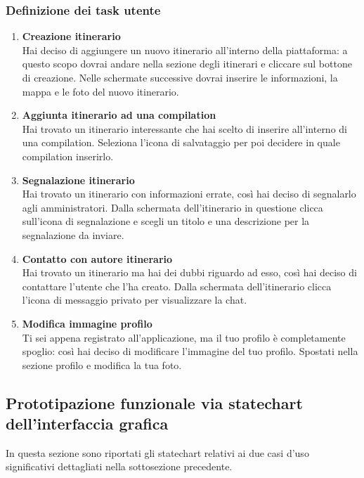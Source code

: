 \documentclass{natourDoc}
\begin{document}
\subsubsection{Definizione dei task utente}
\begin{enumerate}
	\item \textbf{Creazione itinerario} \\
	Hai deciso di aggiungere un nuovo itinerario all’interno della piattaforma: a questo scopo 
	dovrai andare nella sezione degli itinerari e cliccare sul bottone di creazione. Nelle schermate successive dovrai inserire le informazioni, la mappa e le foto del nuovo itinerario.
	\item \textbf{Aggiunta itinerario ad una compilation} \\
	Hai trovato un itinerario interessante che hai scelto di inserire all’interno di una compilation. Seleziona l’icona di salvataggio per poi decidere in quale compilation inserirlo.
	\item \textbf{Segnalazione itinerario} \\
	Hai trovato un itinerario con informazioni errate, così hai deciso di segnalarlo agli amministratori. Dalla schermata dell’itinerario in questione clicca sull'icona di segnalazione e 
	scegli un titolo e una descrizione per la segnalazione da inviare.
	\item \textbf{Contatto con autore itinerario} \\
	Hai trovato un itinerario ma hai dei dubbi riguardo ad esso, così hai deciso di contattare l’utente che l’ha creato. Dalla schermata dell’itinerario clicca l'icona di messaggio privato per visualizzare la chat.
	\item  \textbf{Modifica immagine profilo} \\
	Ti sei appena registrato all'applicazione, ma il tuo profilo è completamente spoglio: così hai deciso di modificare l’immagine del tuo profilo. Spostati nella sezione profilo e modifica la tua foto.
\end{enumerate}

\newpage
\subsection{Prototipazione funzionale via statechart dell'interfaccia grafica}
In questa sezione sono riportati gli statechart relativi ai due 
casi d'uso significativi dettagliati nella sottosezione precedente.
\end{document}
